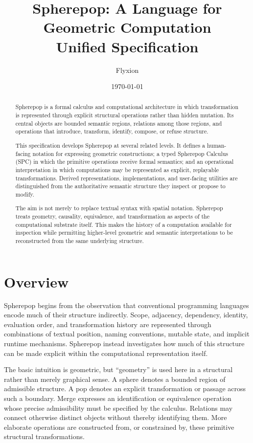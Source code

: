 \documentclass[12pt]{article}
\title{\textbf{Spherepop: A Language for Geometric Computation}\\
\large Unified Specification}
\author{Flyxion}
\date{\today}
\theoremstyle{definition}
\begin{document}
\maketitle

\begin{abstract}
Spherepop is a formal calculus and computational architecture in which transformation is represented through explicit structural operations rather than hidden mutation. Its central objects are bounded semantic regions, relations among those regions, and operations that introduce, transform, identify, compose, or refuse structure.

This specification develops Spherepop at several related levels. It defines a human-facing notation for expressing geometric constructions; a typed Spherepop Calculus (SPC) in which the primitive operations receive formal semantics; and an operational interpretation in which computations may be represented as explicit, replayable transformations. Derived representations, implementations, and user-facing utilities are distinguished from the authoritative semantic structure they inspect or propose to modify.

The aim is not merely to replace textual syntax with spatial notation. Spherepop treats geometry, causality, equivalence, and transformation as aspects of the computational substrate itself. This makes the history of a computation available for inspection while permitting higher-level geometric and semantic interpretations to be reconstructed from the same underlying structure.
\end{abstract}

\tableofcontents

\section{Overview}

Spherepop begins from the observation that conventional programming languages encode much of their structure indirectly. Scope, adjacency, dependency, identity, evaluation order, and transformation history are represented through combinations of textual position, naming conventions, mutable state, and implicit runtime mechanisms. Spherepop instead investigates how much of this structure can be made explicit within the computational representation itself.

The basic intuition is geometric, but ``geometry'' is used here in a structural rather than merely graphical sense. A sphere denotes a bounded region of admissible structure. A pop denotes an explicit transformation or passage across such a boundary. Merge expresses an identification or equivalence operation whose precise admissibility must be specified by the calculus. Relations may connect otherwise distinct objects without thereby identifying them. More elaborate operations are constructed from, or constrained by, these primitive structural transformations.
\end{document}
